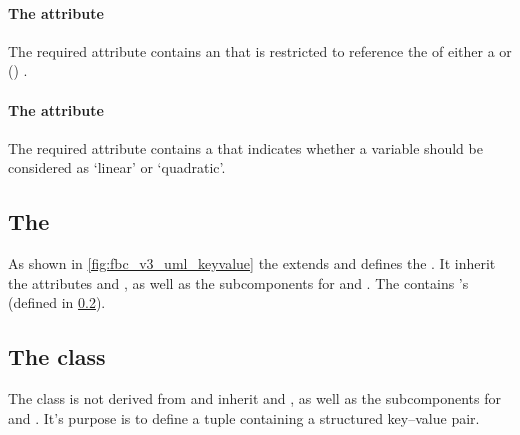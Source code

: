 \paragraph{The  attribute}
The required  attribute contains an  that is restricted to reference the  of either a \Reaction or () \Parameter.

\paragraph{The  attribute}
The required  attribute contains a  that indicates whether a variable should be considered as `linear' or `quadratic'.

\subsection{The \FBC {}}
\label{listofkeyvalues-class}


As shown in \ref{fig:fbc_v3_uml_keyvalue} the \ListOfKeyValues extends \SBase and defines the . It  inherit the
attributes  and , as well as the subcomponents for \Annotation and \Notes. The \ListOfKeyValues contains \KeyValue's (defined in \ref{keyvalue-class}).

\subsection{The \FBC {} class}
\label{keyvalue-class}

The \FBC \KeyValue class is not derived from \SBML \SBase and  inherit
 and , as well as the subcomponents for
\Annotation and \Notes. It's purpose is to define a tuple containing a
structured key--value pair.


